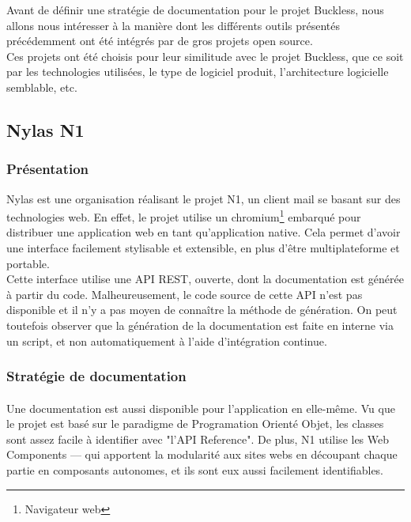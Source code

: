 Avant de définir une stratégie de documentation pour le projet Buckless, nous allons
nous intéresser à la manière dont les différents outils présentés précédemment ont été
intégrés par de gros projets open source.\\
Ces projets ont été choisis pour leur similitude avec le projet Buckless, que ce soit
par les technologies utilisées, le type de logiciel produit, l'architecture logicielle
semblable, etc.

\subsection{Nylas N1}
    \subsubsection{Présentation}
        Nylas est une organisation réalisant le projet N1, un client mail se basant sur des technologies web.
        En effet, le projet utilise un chromium\footnote{Navigateur web} embarqué  pour distribuer une application
        web en tant qu'application native. Cela permet d'avoir une interface facilement stylisable et extensible,
        en plus d'être multiplateforme et portable.\\
        Cette interface utilise une API REST, ouverte, dont la documentation est générée à partir du code.
        Malheureusement, le code source de cette API n'est pas disponible et il n'y a pas moyen de connaître la méthode de génération.
        On peut toutefois observer que la génération de la documentation est faite en interne via un script,
        et non automatiquement à l'aide d'intégration continue.

    \subsubsection{Stratégie de documentation}
        \paragraph{}
            Une documentation est aussi disponible pour l'application en elle-même.
            Vu que le projet est basé sur le paradigme de Programation Orienté Objet, les classes sont assez facile à identifier avec "l'API Reference".
            De plus, N1 utilise les Web Components — qui apportent la modularité aux sites webs en découpant chaque partie en composants autonomes,
            et ils sont eux aussi facilement identifiables.

